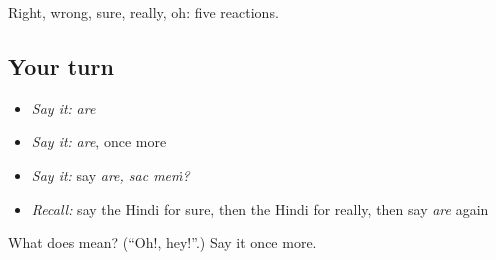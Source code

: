 \begin{grammarlens}[title={What you've built}]
Right, wrong, sure, really, oh: five reactions.
\end{grammarlens}

\subsection*{Your turn}
\begin{itemize}
\raggedright
  \item \emph{Say it:} \emph{are}
  \item \emph{Say it:} \emph{are}, once more
  \item \emph{Say it:} say \emph{are, sac meṁ?}
  \item \emph{Recall:} say the Hindi for sure, then the Hindi for really, then say \emph{are} again
\end{itemize}

\begin{tcolorbox}[breakable,colback=teal!4,colframe=teal!35!black,title={Before you move on}]
What does  mean? (\textquotedblleft{}Oh!, hey!\textquotedblright{}.) Say it once more.
\end{tcolorbox}
